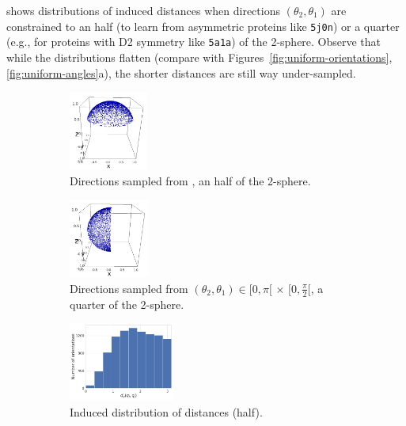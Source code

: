  shows distributions of induced distances when directions $(\theta_2, \theta_1)$ are constrained to an half (to learn from asymmetric proteins like \texttt{5j0n}) or a quarter (e.g., for proteins with D2 symmetry like \texttt{5a1a}) of the 2-sphere.
Observe that while the distributions flatten (compare with Figures~\ref{fig:uniform-orientations},\ref{fig:uniform-angles}a), the shorter distances are still way under-sampled.

\begin{figure}[ht!]
    \centering
    \begin{subfigure}[b]{0.22\linewidth}
        \centering
        \includegraphics[height=7em]{figures/5j0n-half.png}
        \caption{Directions sampled from \todo{$(\theta_2, \theta_1) \in [0,\frac{\pi}{2}[ \, \times \, [0,2\pi[$}, an half of the 2-sphere.}
    \end{subfigure}
    \hfill
    \begin{subfigure}[b]{0.22\linewidth}
        \centering
        \includegraphics[height=7em]{figures/5a1a_quarter.png}
        \caption{Directions sampled from $(\theta_2, \theta_1) \in [0,\pi[ \, \times \, [0,\frac{\pi}{2}[$, a quarter of the 2-sphere.}
    \end{subfigure}
    \hfill
    \begin{subfigure}[b]{0.22\linewidth}
        \centering
        \includegraphics[height=7em]{figures/dQ_5j0n_half.pdf}
        \caption{Induced distribution of distances (half).}
    \end{subfigure}
    \hfill
    \begin{subfigure}[b]{0.22\linewidth}
        \centering

\end{subfigure}
\end{figure}
